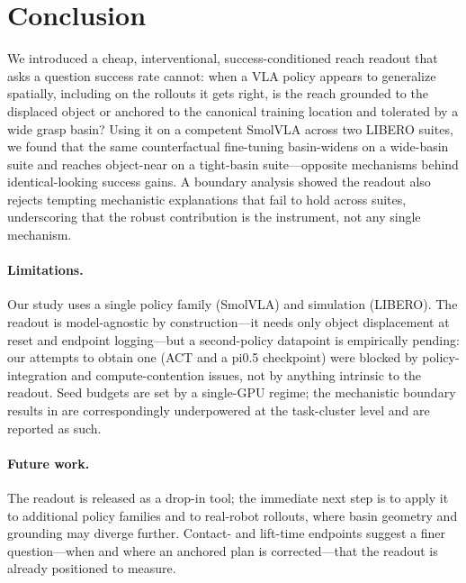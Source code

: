 \section{Conclusion}
\label{sec:conclusion}

We introduced a cheap, interventional, success-conditioned reach readout that asks a
question success rate cannot: when a VLA policy appears to generalize spatially, including
on the rollouts it gets right, is the reach grounded to the displaced object or anchored to
the canonical training location and tolerated by a wide grasp basin? Using it on a
competent SmolVLA across two LIBERO suites, we found that the same counterfactual
fine-tuning basin-widens on a wide-basin suite and reaches object-near on a tight-basin
suite---opposite mechanisms behind identical-looking success gains. A boundary analysis
showed the readout also rejects tempting mechanistic explanations that fail to hold across
suites, underscoring that the robust contribution is the instrument, not any single
mechanism.

\paragraph{Limitations.}
Our study uses a single policy family (SmolVLA) and simulation (LIBERO). The readout is
model-agnostic by construction---it needs only object displacement at reset and endpoint
logging---but a second-policy datapoint is empirically pending: our attempts to obtain one
(ACT and a pi0.5 checkpoint) were blocked by policy-integration and compute-contention
issues, not by anything intrinsic to the readout.
Seed budgets are set by a single-GPU regime; the mechanistic boundary results in
 are correspondingly underpowered at the task-cluster level and are
reported as such.

\paragraph{Future work.}
The readout is released as a drop-in tool; the immediate next step is to apply it to
additional policy families and to real-robot rollouts, where basin geometry and grounding
may diverge further. Contact- and lift-time endpoints suggest a finer question---when and
where an anchored plan is corrected---that the readout is already positioned to measure.
